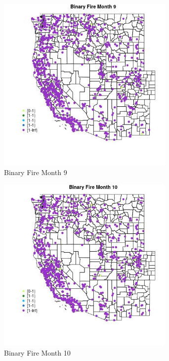 \begin{figure} 
\centering  
\includegraphics[width=0.77\textwidth]{Code_Outputs/Report_ML_input_PM25_Step4_part_f_de_duplicated_aves_prioritize_24hr_obswNAs_MapObsMo9Binary_Fire.jpg} 
\caption{\label{fig:Report_ML_input_PM25_Step4_part_f_de_duplicated_aves_prioritize_24hr_obswNAsMapObsMo9Binary_Fire}Binary Fire Month 9} 
\end{figure} 
 

\begin{figure} 
\centering  
\includegraphics[width=0.77\textwidth]{Code_Outputs/Report_ML_input_PM25_Step4_part_f_de_duplicated_aves_prioritize_24hr_obswNAs_MapObsMo10Binary_Fire.jpg} 
\caption{\label{fig:Report_ML_input_PM25_Step4_part_f_de_duplicated_aves_prioritize_24hr_obswNAsMapObsMo10Binary_Fire}Binary Fire Month 10} 
\end{figure} 
 

